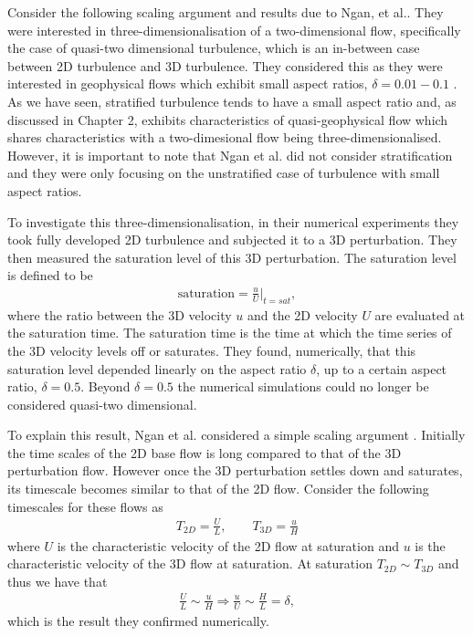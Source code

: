 Consider the following scaling argument and results due to Ngan, et al.\cite{ngan2005}. They were interested in three-dimensionalisation of a two-dimensional flow, specifically the case of quasi-two dimensional turbulence, which is an in-between case between 2D turbulence and 3D turbulence. They considered this as they were interested in geophysical flows which exhibit small aspect ratios, $\delta=0.01-0.1$ \cite{ngan2005}. As we have seen, stratified turbulence tends to have a small aspect ratio and, as discussed in Chapter 2, exhibits characteristics of quasi-geophysical flow which shares characteristics with a two-dimesional flow being three-dimensionalised. However, it is important to note that Ngan et al.\cite{ngan2005} did not consider stratification and they were only focusing on the unstratified case of turbulence with small aspect ratios. 

To investigate this three-dimensionalisation, in their numerical experiments they took fully developed 2D turbulence and subjected it to a 3D perturbation. They then measured the saturation level of this 3D perturbation. The saturation level is defined to be
\begin{align}
\text{saturation} = \frac{u}{U}\bigg|_{t=sat}, \label{ngan_scale}
\end{align}
where the ratio between the 3D velocity $u$ and the 2D velocity $U$ are evaluated at the saturation time. The saturation time is the time at which the time series of the 3D velocity levels off or saturates. They found, numerically, that this saturation level depended linearly on the aspect ratio $\delta$, up to a certain aspect ratio, $\delta=0.5$. Beyond $\delta=0.5$ the numerical simulations could no longer be considered quasi-two dimensional. 

To explain this result, Ngan et al. considered a simple scaling argument \cite{ngan2004,ngan2005}. Initially the time scales of the 2D base flow is long compared to that of the 3D perturbation flow. However once the 3D perturbation settles down and saturates, its timescale becomes similar to that of the 2D flow.  Consider the following timescales for these flows \cite{ngan2005} as
\begin{align}
T_{2D} = \frac{U}{L},\qquad T_{3D} =\frac{u}{H}
\end{align}
where $U$ is the characteristic velocity of the 2D flow at saturation and $u$ is the characteristic velocity of the 3D flow at saturation. At saturation $T_{2D}\sim T_{3D}$ and thus we have that 
\begin{align}
\frac{U}{L}\sim\frac{u}{H} \Rightarrow \frac{u}{U} \sim \frac{H}{L} = \delta,
\end{align}
which is the result they confirmed numerically. 


